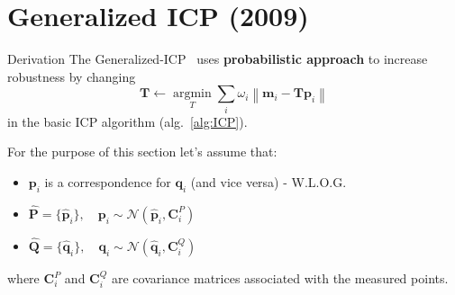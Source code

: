 \documentclass[aspectratio=1610]{beamer}
\renewcommand*{\cite}{\parencite}
\newcommand{\norm}[1]{\left\lVert#1\right\rVert}
\DeclareMathOperator*{\argmin}{argmin}
\DeclareMathOperator*{\argmax}{argmax}
\begin{document}
\section{Generalized ICP (2009)}
\begin{frame}[allowframebreaks]{Derivation}
The Generalized-ICP~\cite{gicp} uses \textbf{probabilistic approach} to increase robustness by changing
\[ \bm{T}\gets\argmin\limits_T \sum\limits_i \omega_i \norm{\bm{m}_i-\bm{T}\bm{p}_i} \]
in the basic ICP algorithm (alg.~\ref{alg:ICP}).

\framebreak

For the purpose of this section let's assume that:
\begin{itemize}
  \item $\bm{p}_i$ is a correspondence for $\bm{q}_i$ (and vice versa) - W.L.O.G.
  \item $\hat{\bm{P}}=\{\hat{\bm{p}}_i\}, \quad \bm{p}_i \sim \mathcal{N}(\hat{\bm{p}}_i,\bm{C}_i^P)$
  \item $\hat{\bm{Q}}=\{\hat{\bm{q}}_i\}, \quad \bm{q}_i \sim \mathcal{N}(\hat{\bm{q}}_i,\bm{C}_i^Q)$
\end{itemize}
where $\bm{C}_i^P$ and $\bm{C}_i^Q$ are covariance matrices associated with the measured points.




\framebreak




\end{frame}
\end{document}
